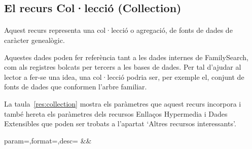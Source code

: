 \subsection{El recurs Col·lecció (Collection)}

    \paragraph{}
    Aquest recurs representa una col·lecció o agregació, de fonts de dades de caràcter genealògic.

    Aquestes dades poden fer referència tant a les dades internes de FamilySearch, com als registres bolcats per tercers a les bases de dades. Per tal d'ajudar al lector a fer-se una idea, una col·lecció podria ser, per exemple el, conjunt de fonts de dades que conformen l'arbre familiar.

    La taula~\ref{res:collection} mostra els paràmetres que aquest recurs incorpora i també hereta els paràmetres dels recursos Enllaços Hypermedia i Dades Extensibles que poden ser trobats a l'apartat `Altres recursos interessants'.

    \begin{center}
             {param=\param,format=\format,desc=\desc}
             {\param&\format&\desc}
     \end{center}
